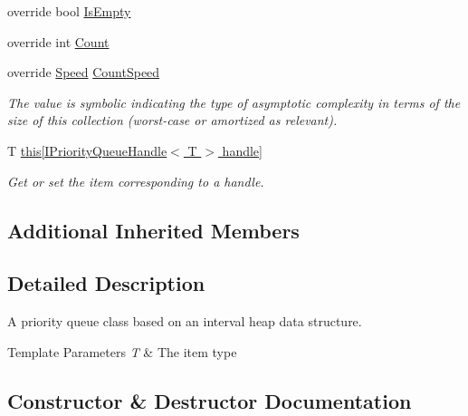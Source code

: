 \begin{DoxyCompactItemize}
override bool \hyperlink{class_c5_1_1_interval_heap_aa6146324a58bb879c502a9f1cfb483a8}{Is\+Empty}
\item 
override int \hyperlink{class_c5_1_1_interval_heap_a4db5c619c65ba918015da4cd45f7ba8d}{Count}
\item 
override \hyperlink{namespace_c5_a615ba88dcdaa8d5a3c5f833a73d7fad6}{Speed} \hyperlink{class_c5_1_1_interval_heap_a33d630a81c86d10cf5cff931662f3808}{Count\+Speed}
\begin{DoxyCompactList}\small\item\em The value is symbolic indicating the type of asymptotic complexity in terms of the size of this collection (worst-\/case or amortized as relevant). \end{DoxyCompactList}\item 
T \hyperlink{class_c5_1_1_interval_heap_a91e32b822986bd74b9e3862a767d0c13}{this\mbox{[}\+I\+Priority\+Queue\+Handle$<$ T $>$ handle\mbox{]}}
\begin{DoxyCompactList}\small\item\em Get or set the item corresponding to a handle. \end{DoxyCompactList}\end{DoxyCompactItemize}
\subsection*{Additional Inherited Members}


\subsection{Detailed Description}
A priority queue class based on an interval heap data structure. 


\begin{DoxyTemplParams}{Template Parameters}
{\em T} & The item type\\
\hline
\end{DoxyTemplParams}


\subsection{Constructor \& Destructor Documentation}
\hypertarget{class_c5_1_1_interval_heap_a5a6140a981bbc3f40b101a26dee6c37f}{}
